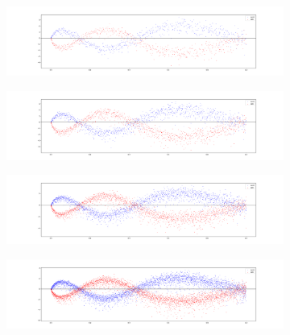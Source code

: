 \begin{figure}[htp] 
    \begin{subfigure}{1.0\textwidth}
        \centering
        \includegraphics[width=\textwidth]{src/sutherland_4096.png}%
        \label{fig:sutherland_4096}
    \end{subfigure}
    
    \begin{subfigure}{1.0\textwidth}
        \centering
        \includegraphics[width=\textwidth]{src/sutherland_8192.png}%
        \label{fig:sutherland_8192}
    \end{subfigure}

    \begin{subfigure}{1.0\textwidth}
        \centering
        \includegraphics[width=\textwidth]{src/sutherland_16384.png}%
        \label{fig:sutherland_16384}
    \end{subfigure}

    \begin{subfigure}{1.0\textwidth}
        \centering
        \includegraphics[width=\textwidth]{src/sutherland_32768.png}%
        \label{fig:sutherland_32768}
    \end{subfigure}


\end{figure}
